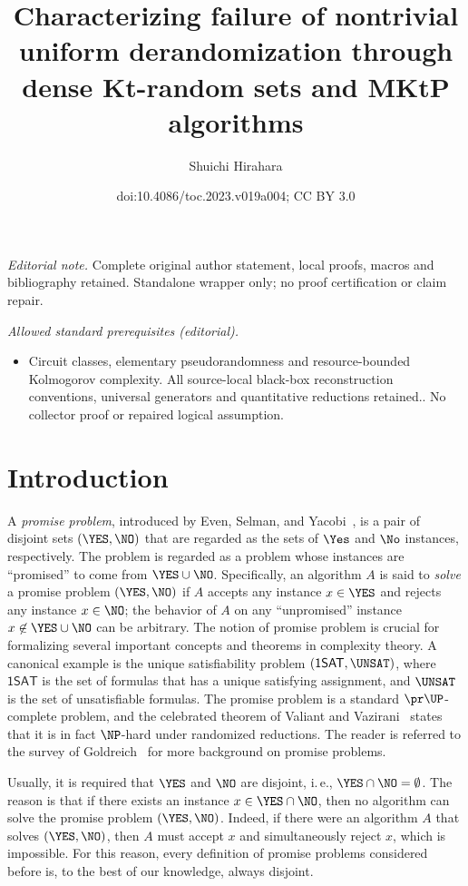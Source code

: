 \documentclass[11pt]{article}
\title{Characterizing failure of nontrivial uniform derandomization through dense Kt-random sets and MKtP algorithms}
\author{Shuichi Hirahara}
\date{doi:10.4086/toc.2023.v019a004; CC BY 3.0}
\numberwithin{equation}{section}
\theoremstyle{definition}
\theoremstyle{plain}
\newcommand{\ie}{i.\,e.}
\begin{document}
\maketitle
\noindent\textit{Editorial note.} Complete original author statement, local proofs, macros and bibliography retained. Standalone wrapper only; no proof certification or claim repair.\par\medskip
\noindent\textit{Allowed standard prerequisites (editorial).}\begin{itemize}
\item Circuit classes, elementary pseudorandomness and resource-bounded Kolmogorov complexity. All source-local black-box reconstruction conventions, universal generators and quantitative reductions retained.. No collector proof or repaired logical assumption.
\end{itemize}\medskip
\section{Introduction}
\label{section_introduction}


A \emph{promise problem}, introduced by Even, Selman, and Yacobi~\cite{EvenSY84_iandc_journals},
is a pair of disjoint sets $(\YES, \NO)$ that are regarded as the sets of $\Yes$ and $\No$ instances, respectively.
The problem is regarded as a problem whose instances are ``promised'' to come from $\YES \cup \NO$.
Specifically,
an algorithm $A$ is said to \emph{solve} a promise problem $(\YES, \NO)$
if
$A$ accepts any instance $x \in \YES$ and rejects any instance $x \in \NO$;
the behavior of $A$ on any ``unpromised'' instance $x \not\in \YES \cup \NO$ can be arbitrary.
The notion of promise problem is crucial for formalizing several important concepts and theorems in complexity theory.
A canonical example is the unique satisfiability problem $(\mathsf{1SAT}, \UNSAT)$, where $\mathsf{1SAT}$ is the set of formulas that has a unique satisfying assignment, and $\UNSAT$ is the set of unsatisfiable formulas.
%
%
The promise problem is a standard $\pr\UP$-complete problem, and
the celebrated theorem of Valiant and Vazirani~\cite{ValiantV86_tcs_journals}
states that it is in fact $\NP$-hard under randomized reductions.
The reader is referred to the survey of Goldreich~\cite{Goldreich06a_birthday_conf} for more background on promise problems.

Usually, it is required that $\YES$ and $\NO$ are disjoint, \ie, $\YES \cap \NO = \emptyset$.
The reason is that if there exists an instance $x \in \YES \cap \NO$,
then
no algorithm can solve the promise problem $(\YES, \NO)$.
Indeed, if there were an algorithm $A$ that solves $(\YES, \NO)$,
then
$A$ must accept $x$ and simultaneously reject $x$, which is impossible.
For this reason,
every definition of promise problems considered before
is, to the best of our knowledge,
always disjoint.
\end{document}
